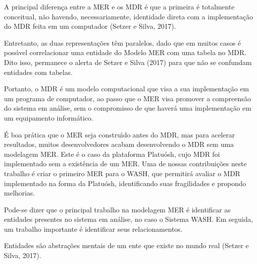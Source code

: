\documentclass[
12pt,		%
openright,	%
twoside,  %
a4paper,			%
chapter=TITLE,		%
english,			%
french,				%
spanish,			%
brazil				%
]{USPSC-classe/USPSC}
\begin{document}
A principal diferen\c{c}a entre a MER e os MDR \'e que a primeira \'e totalmente conceitual, n\~ao havendo, necessariamente, identidade direta com a implementa\c{c}\~ao do MDR feita em um computador  (Setzer e Silva, 2017).









Entretanto, as duas representa\c{c}\~oes t\^em paralelos, dado que em muitos casos \'e poss\'{\i}vel correlacionar uma entidade do Modelo MER com uma tabela no MDR. Dito isso, permanece o alerta de  Setzer e Silva (2017) para que n\~ao se confundam entidades com tabelas.









Portanto, o MDR \'e um modelo computacional que visa a sua implementa\c{c}\~ao em um programa de computador, ao passo que o MER visa promover a compreens\~ao do sistema em an\'alise, sem o compromisso de que haver\'a uma implementa\c{c}\~ao em um equipamento inform\'atico.









\'E boa pr\'atica que o MER seja constru\'{\i}do antes do MDR, mas para acelerar resultados, muitos desenvolvedores acabam desenvolvendo o MDR sem uma modelagem MER. Este \'e o caso da plataforma Platu\'osh, cujo MDR foi implementado sem a exist\^encia de um MER. Uma de nossas contribui\c{c}\~oes neste trabalho \'e criar o primeiro MER para o WASH, que permitir\'a avaliar o MDR implementado na forma da Platu\'osh, identificando suas fragilidades e propondo melhorias.









Pode-se dizer que o principal trabalho na modelagem MER \'e identificar as entidades presentes no sistema em an\'alise, no caso o Sistema WASH. Em seguida, um trabalho importante \'e identificar seus relacionamentos.









Entidades s\~ao abstra\c{c}\~oes mentais de um ente que existe no mundo real  (Setzer e Silva, 2017).
\end{document}
